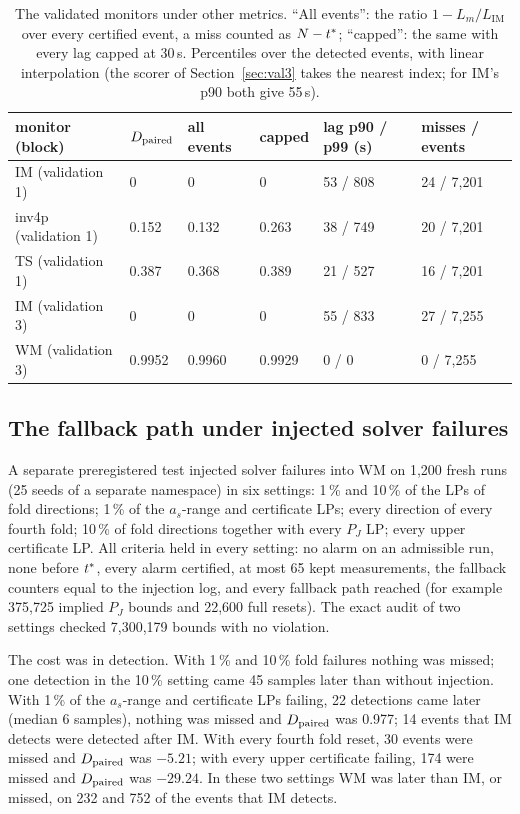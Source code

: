 \begin{table}[t]
\centering\small
\caption{The validated monitors under other metrics. ``All events'': the ratio $1-L_m/L_{\mathrm{IM}}$ over every
certified event, a miss counted as $N-t^{\ast}$; ``capped'': the same with every lag capped at 30\,s. Percentiles over
the detected events, with linear interpolation (the scorer of Section~\ref{sec:val3} takes the nearest index;
for IM's p90 both give 55\,s).}\label{tab:metrics}
\begin{tabular}{llllll}
\toprule
monitor (block) & $D_{\mathrm{paired}}$ & all events & capped & lag p90 / p99 (s) & misses / events\\
\midrule
IM (validation 1) & 0 & 0 & 0 & 53 / 808 & 24 / 7,201\\
inv4p (validation 1) & 0.152 & 0.132 & 0.263 & 38 / 749 & 20 / 7,201\\
TS (validation 1) & 0.387 & 0.368 & 0.389 & 21 / 527 & 16 / 7,201\\
IM (validation 3) & 0 & 0 & 0 & 55 / 833 & 27 / 7,255\\
WM (validation 3) & 0.9952 & 0.9960 & 0.9929 & 0 / 0 & 0 / 7,255\\
\bottomrule
\end{tabular}
\end{table}

\subsection{The fallback path under injected solver failures}\label{sec:inject}

A separate preregistered test injected solver failures into WM on 1,200 fresh runs (25 seeds of a separate namespace)
in six settings: 1\,\% and 10\,\% of the LPs of fold directions; 1\,\% of the $a_s$-range and certificate LPs; every
direction of every fourth fold; 10\,\% of fold directions together with every $P_J$ LP; every upper certificate LP.
All criteria held in every setting: no alarm on an admissible run, none before $t^{\ast}$, every alarm certified, at most
65 kept measurements, the fallback counters equal to the injection log, and every fallback path reached (for example
375,725 implied $P_J$ bounds and 22,600 full resets). The exact audit of two settings checked 7,300,179 bounds with no
violation.

The cost was in detection. With 1\,\% and 10\,\% fold failures nothing was missed; one detection in the 10\,\% setting
came 45 samples later than without injection. With 1\,\% of the $a_s$-range and certificate LPs failing, 22 detections
came later (median 6 samples), nothing was missed and $D_{\mathrm{paired}}$ was 0.977; 14 events that IM detects were detected after
IM. With every fourth fold reset, 30 events were missed and $D_{\mathrm{paired}}$ was $-5.21$; with every upper certificate failing,
174 were missed and $D_{\mathrm{paired}}$ was $-29.24$. In these two settings WM was later than IM, or missed, on 232 and 752 of the
events that IM detects.

